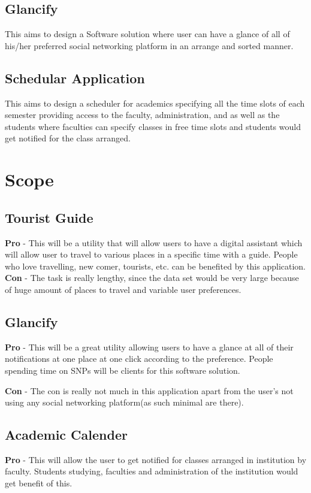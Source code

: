 \documentclass[12pt]{article}
\begin{document}
    
    \subsection{Glancify}
    This aims to design a Software solution where user can have a glance of all of his/her preferred social networking platform in an arrange and sorted manner.
    
    \subsection{Schedular Application}
    This aims to design a scheduler for academics specifying all the time slots of each semester providing access to the faculty, administration, and as well as the students where faculties can specify classes in free time slots and students would get notified for the class arranged.
    
    \section{Scope}
    \subsection{Tourist Guide}
    \textbf{Pro} - This will be a utility that will allow users to have a digital assistant which will allow user to travel to various places in a specific time with a guide. People who love travelling, new comer, tourists, etc. can be benefited by this application. 
    \textbf{Con} - The task is really lengthy, since the data set would be very large because of huge amount of places to travel and variable user preferences.
    
    \subsection{Glancify}
    \textbf{Pro} - This will be a great utility allowing users to have a glance at all of their notifications at one place at one click according to the preference. People spending time on SNPs will be clients for this software solution.
    
    \textbf{Con} - The con is really not much in this application apart from the user's not using any social networking platform(as such minimal are there).
	
	\subsection{Academic Calender}
	\textbf{Pro} - This will allow the user to get notified for classes arranged in institution by faculty. Students studying, faculties and administration of the institution would get benefit of this. 
	
\end{document}
